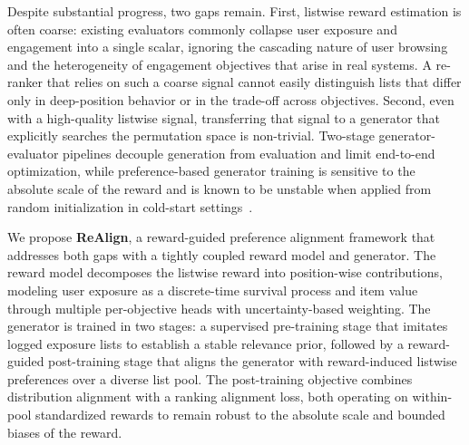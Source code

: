 \documentclass[sigconf]{acmart}
\begin{document}
Despite substantial progress, two gaps remain. First, listwise reward estimation is often coarse: existing evaluators commonly collapse user exposure and engagement into a single scalar, ignoring the cascading nature of user browsing and the heterogeneity of engagement objectives that arise in real systems. A re-ranker that relies on such a coarse signal cannot easily distinguish lists that differ only in deep-position behavior or in the trade-off across objectives. Second, even with a high-quality listwise signal, transferring that signal to a generator that explicitly searches the permutation space is non-trivial. Two-stage generator-evaluator pipelines decouple generation from evaluation and limit end-to-end optimization, while preference-based generator training is sensitive to the absolute scale of the reward and is known to be unstable when applied from random initialization in cold-start settings~\cite{lin2025gref}.

We propose \textbf{ReAlign}, a reward-guided preference alignment framework that addresses both gaps with a tightly coupled reward model and generator. The reward model decomposes the listwise reward into position-wise contributions, modeling user exposure as a discrete-time survival process and item value through multiple per-objective heads with uncertainty-based weighting. The generator is trained in two stages: a supervised pre-training stage that imitates logged exposure lists to establish a stable relevance prior, followed by a reward-guided post-training stage that aligns the generator with reward-induced listwise preferences over a diverse list pool. The post-training objective combines distribution alignment with a ranking alignment loss, both operating on within-pool standardized rewards to remain robust to the absolute scale and bounded biases of the reward.
\end{document}
